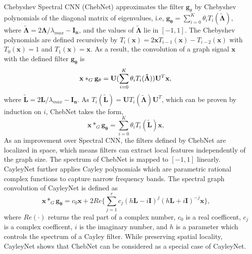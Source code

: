 	Chebyshev Spectral CNN (ChebNet) \cite{defferrard2016convolutional} approximates the filter $\mathbf{g}_\theta$ by Chebyshev polynomials of the diagonal matrix of eigenvalues, i.e, $\mathbf{g_\theta}= \sum_{i=0}^{K} \theta_i T_i(\mathbf{\tilde{\Lambda}})$, where $\mathbf{\tilde{\Lambda}} = 2\mathbf{\Lambda}/\lambda_{max}-\mathbf{I_n}$, and the values of $\mathbf{\tilde{\Lambda}}$ lie in $[-1,1]$. The Chebyshev polynomials are defined recursively by $T_i(\mathbf{x}) = 2\mathbf{x}T_{i-1}(\mathbf{x})-T_{i-2}(\mathbf{x})$ with $T_0(\mathbf{x}) = 1$ and $T_1(\mathbf{x})=\mathbf{x}$. As a result, the convolution of a graph signal $\mathbf{x}$ with the defined filter $\mathbf{g_\theta}$ is 
	\begin{equation}
	\label{eq:chebpoly}
	\mathbf{x} \ast_G \mathbf{g_\theta} = \mathbf{U}(\sum_{i=0}^{K} \theta_i T_i(\mathbf{\tilde{\Lambda}}))\mathbf{U}^T\mathbf{x}, \\
	\end{equation}
	where $\mathbf{\tilde{L}} = 2\mathbf{L}/\lambda_{max}-\mathbf{I_n}$. 
	As $T_i(\mathbf{\tilde{L}})=\mathbf{U}T_i(\mathbf{\tilde{\Lambda}})\mathbf{U}^T$, which can be proven by induction on $i$, ChebNet takes the form, 
	\begin{equation}
	\label{eq:chebnet}
	\mathbf{x} \ast_G \mathbf{g_\theta} = \sum_{i=0}^{K} \theta_iT_i(\mathbf{\tilde{L}})\mathbf{x}, 
	\end{equation}
	As an improvement over Spectral CNN, the filters defined by ChebNet are localized in space, which means filters can extract local features independently of the graph size. The spectrum of ChebNet is mapped to $[-1,1]$ linearly. CayleyNet \cite{levie2017cayleynets} further applies Cayley polynomials which are parametric rational complex functions to capture narrow frequency bands. The spectral graph convolution of CayleyNet is defined as 
	\begin{equation}
	    \mathbf{x} \ast_G \mathbf{g_\theta} = c_0\mathbf{x}+2Re\{\sum_{j=1}^rc_j(h\mathbf{L}- i\mathbf{I})^j(h\mathbf{L}+ i\mathbf{I})^{-j}\mathbf{x}\},
	\end{equation}
    where $Re(\cdot)$ returns the real part of a complex number, $c_0$ is a real coefficent, $c_j$ is a complex coefficent, $i$ is the imaginary number, and $h$ is a parameter which controls the spectrum of a Cayley filter. While preserving spatial locality, CayleyNet shows that ChebNet can be considered as a special case of CayleyNet.

